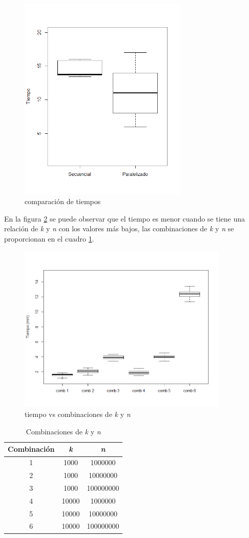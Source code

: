 \documentclass{article}
\begin{document}
\begin{figure}[h!]
\centering\includegraphics[width=80mm]{p8time.png}
\caption{comparación de tiempos}
\label{fig1}
\end{figure}


En la figura \ref{fig2} se puede observar que el tiempo es menor cuando se tiene una relación de \textit{k} y \textit{n} con los valores más bajos, las combinaciones de \textit{k} y \textit{n} se proporcionan en el cuadro \ref{combikn}.

\begin{figure}[h!]
\centering\includegraphics[width=100mm]{p8comb.png}
\caption{tiempo vs combinaciones de \textit{k} y \textit{n}}
\label{fig2}
\end{figure}

\begin{table}[h!]
\caption{Combinaciones de \textit{k} y \textit{n} }
\label{combikn}
\vspace*{3mm}
\centering
\begin{tabular}{c|c|c} 
Combinación&  \textit{k}  &  \textit{n} \\  \hline
1 & 1000 & 1000000  \\
2 &  1000& 10000000 \\
3 & 1000 &100000000\\
4 & 10000&1000000 \\
5& 10000&10000000\\
6 & 10000& 100000000\\
\end{tabular}
\end{table}
\end{document}
